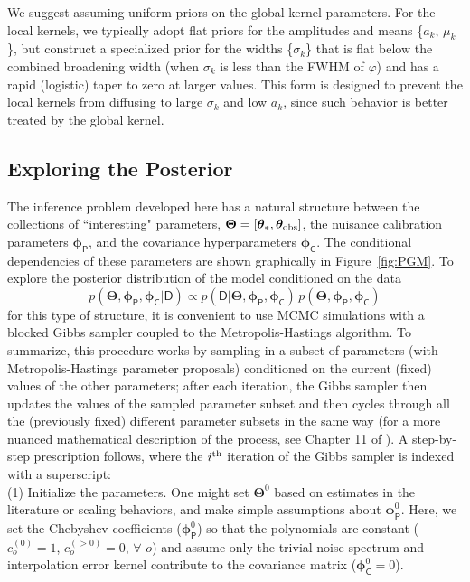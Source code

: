 \documentclass[iop,floatfix,numberedappendix,twocolappendix]{emulateapj}
\newcommand{\vD}{\mathsf{D}}
\newcommand{\vt}{ {\bm \theta}}
\newcommand{\vT}{ {\bm \Theta}}
\newcommand{\vp}{ {\bm \phi}}
\newcommand{\cheb}{ \vp_{\mathsf{P}}}
\newcommand{\cov}{ \vp_{\mathsf{C}}}
\begin{document}
We suggest assuming uniform priors on the global kernel parameters.  For the local kernels, we
typically adopt flat priors for the amplitudes and means \{$a_k$, $\mu_k$\}, but construct a
specialized prior for the widths \{$\sigma_k$\} that is flat below the combined broadening width
(when $\sigma_k$ is less than the FWHM of $\varphi$) and has a rapid (logistic) taper to zero at
larger values.  This form is designed to prevent the local kernels from diffusing to large
$\sigma_k$ and low $a_k$, since such behavior is better treated by the global kernel.  

\subsection{Exploring the Posterior} \label{subsec:MCMC}

The inference problem developed here has a natural structure between the collections of
``interesting" parameters, $\vT = [\vt_{\ast}, \vt_{\rm obs}]$, the nuisance calibration parameters
$\cheb$, and the covariance hyperparameters $\cov$. The conditional dependencies of these parameters
are shown graphically in Figure~\ref{fig:PGM}. To explore the posterior distribution of the model
conditioned on the data
\begin{equation} 
p(\vT, \cheb, \cov | \vD) \propto p(\vD | \vT, \cheb, \cov) \, p(\vT, \cheb, \cov)
\label{eqn:post}
\end{equation}
for this type of structure, it is convenient to use MCMC simulations with a blocked Gibbs 
sampler coupled to the Metropolis-Hastings algorithm.  To summarize, this procedure works by 
sampling in a subset of parameters (with Metropolis-Hastings parameter proposals) conditioned on the current (fixed) 
values of the other parameters; after each iteration, the Gibbs sampler then updates the values of 
the sampled parameter subset and then cycles through all the (previously fixed) different parameter 
subsets in the same way (for a more nuanced mathematical description of the process, see Chapter 11 
of \citealt{gelman13}).  A step-by-step prescription follows, where the $i^{\rm th}$ 
iteration of the Gibbs sampler is indexed with a superscript: \\

\noindent (1) Initialize the parameters.  One might set $\vT^0$ based on estimates in the 
literature or scaling behaviors, and make simple assumptions about $\cheb^0$.  Here, we set the 
Chebyshev coefficients ($\cheb^0$) so that the polynomials are constant ($c_o^{(0)} = 1$,  
$c_o^{(>0)} = 0$, $\forall$ $o$) and assume only the trivial noise spectrum and interpolation error 
kernel contribute to the covariance matrix ($\cov^0 = 0$).  \\
\end{document}
